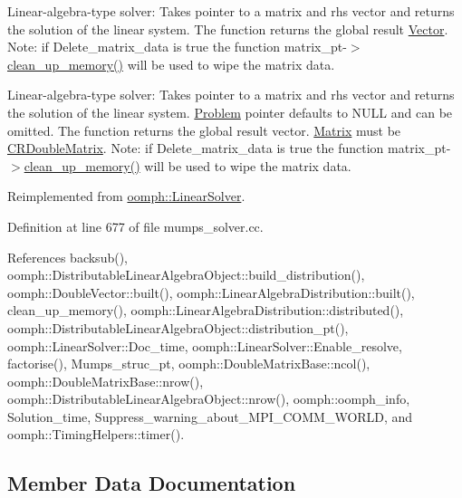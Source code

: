 Linear-\/algebra-\/type solver\+: Takes pointer to a matrix and rhs vector and returns the solution of the linear system. The function returns the global result \hyperlink{classoomph_1_1Vector}{Vector}. Note\+: if Delete\+\_\+matrix\+\_\+data is true the function matrix\+\_\+pt-\/$>$\hyperlink{classoomph_1_1MumpsSolver_adc1541e4a9cbbe9c641f988380618713}{clean\+\_\+up\+\_\+memory()} will be used to wipe the matrix data. 

Linear-\/algebra-\/type solver\+: Takes pointer to a matrix and rhs vector and returns the solution of the linear system. \hyperlink{classoomph_1_1Problem}{Problem} pointer defaults to N\+U\+LL and can be omitted. The function returns the global result vector. \hyperlink{classoomph_1_1Matrix}{Matrix} must be \hyperlink{classoomph_1_1CRDoubleMatrix}{C\+R\+Double\+Matrix}. Note\+: if Delete\+\_\+matrix\+\_\+data is true the function matrix\+\_\+pt-\/$>$\hyperlink{classoomph_1_1MumpsSolver_adc1541e4a9cbbe9c641f988380618713}{clean\+\_\+up\+\_\+memory()} will be used to wipe the matrix data. 

Reimplemented from \hyperlink{classoomph_1_1LinearSolver_a546c09822d18191df14caed864c04c09}{oomph\+::\+Linear\+Solver}.



Definition at line 677 of file mumps\+\_\+solver.\+cc.



References backsub(), oomph\+::\+Distributable\+Linear\+Algebra\+Object\+::build\+\_\+distribution(), oomph\+::\+Double\+Vector\+::built(), oomph\+::\+Linear\+Algebra\+Distribution\+::built(), clean\+\_\+up\+\_\+memory(), oomph\+::\+Linear\+Algebra\+Distribution\+::distributed(), oomph\+::\+Distributable\+Linear\+Algebra\+Object\+::distribution\+\_\+pt(), oomph\+::\+Linear\+Solver\+::\+Doc\+\_\+time, oomph\+::\+Linear\+Solver\+::\+Enable\+\_\+resolve, factorise(), Mumps\+\_\+struc\+\_\+pt, oomph\+::\+Double\+Matrix\+Base\+::ncol(), oomph\+::\+Double\+Matrix\+Base\+::nrow(), oomph\+::\+Distributable\+Linear\+Algebra\+Object\+::nrow(), oomph\+::oomph\+\_\+info, Solution\+\_\+time, Suppress\+\_\+warning\+\_\+about\+\_\+\+M\+P\+I\+\_\+\+C\+O\+M\+M\+\_\+\+W\+O\+R\+LD, and oomph\+::\+Timing\+Helpers\+::timer().



\subsection{Member Data Documentation}
\mbox{\label{classoomph_1_1MumpsSolver_a5b40d6e4d26ada5edef87bc1fa511d06}} 
